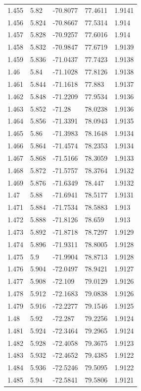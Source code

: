 \begin{tabular}{lllll}
1.455 & 5.82 & -70.8077 & 77.4611 & 1.9141 \\
1.456 & 5.824 & -70.8667 & 77.5314 & 1.914 \\
1.457 & 5.828 & -70.9257 & 77.6016 & 1.914 \\
1.458 & 5.832 & -70.9847 & 77.6719 & 1.9139 \\
1.459 & 5.836 & -71.0437 & 77.7423 & 1.9138 \\
1.46 & 5.84 & -71.1028 & 77.8126 & 1.9138 \\
1.461 & 5.844 & -71.1618 & 77.883 & 1.9137 \\
1.462 & 5.848 & -71.2209 & 77.9534 & 1.9136 \\
1.463 & 5.852 & -71.28 & 78.0238 & 1.9136 \\
1.464 & 5.856 & -71.3391 & 78.0943 & 1.9135 \\
1.465 & 5.86 & -71.3983 & 78.1648 & 1.9134 \\
1.466 & 5.864 & -71.4574 & 78.2353 & 1.9134 \\
1.467 & 5.868 & -71.5166 & 78.3059 & 1.9133 \\
1.468 & 5.872 & -71.5757 & 78.3764 & 1.9132 \\
1.469 & 5.876 & -71.6349 & 78.447 & 1.9132 \\
1.47 & 5.88 & -71.6941 & 78.5177 & 1.9131 \\
1.471 & 5.884 & -71.7534 & 78.5883 & 1.913 \\
1.472 & 5.888 & -71.8126 & 78.659 & 1.913 \\
1.473 & 5.892 & -71.8718 & 78.7297 & 1.9129 \\
1.474 & 5.896 & -71.9311 & 78.8005 & 1.9128 \\
1.475 & 5.9 & -71.9904 & 78.8713 & 1.9128 \\
1.476 & 5.904 & -72.0497 & 78.9421 & 1.9127 \\
1.477 & 5.908 & -72.109 & 79.0129 & 1.9126 \\
1.478 & 5.912 & -72.1683 & 79.0838 & 1.9126 \\
1.479 & 5.916 & -72.2277 & 79.1546 & 1.9125 \\
1.48 & 5.92 & -72.287 & 79.2256 & 1.9124 \\
1.481 & 5.924 & -72.3464 & 79.2965 & 1.9124 \\
1.482 & 5.928 & -72.4058 & 79.3675 & 1.9123 \\
1.483 & 5.932 & -72.4652 & 79.4385 & 1.9122 \\
1.484 & 5.936 & -72.5246 & 79.5095 & 1.9122 \\
1.485 & 5.94 & -72.5841 & 79.5806 & 1.9121 \\

\end{tabular}
